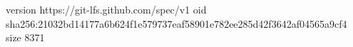 version https://git-lfs.github.com/spec/v1
oid sha256:21032bd14177a6b624f1e579737eaf58901e782ee285d42f3642af04565a9cf4
size 8371

